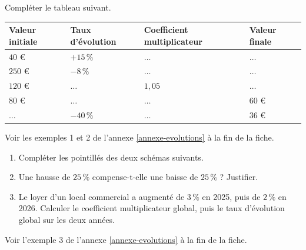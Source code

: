 \documentclass[10pt,a4paper]{article}
\begin{document}
\begin{bloc}
\begin{exo}
Compléter le tableau suivant.

\medskip

\begin{center}
\renewcommand{\arraystretch}{1.5}
\begin{tabular}{|C{0.18\textwidth}|C{0.18\textwidth}|C{0.18\textwidth}|C{0.18\textwidth}|}
    \hline
    \textbf{Valeur initiale} & \textbf{Taux d'évolution} & \textbf{Coefficient multiplicateur} & \textbf{Valeur finale} \\ \hline
    \(40\) \euro & \(+15\,\%\) & \(\dots\) & \(\dots\) \\ \hline
    \(250\) \euro & \(-8\,\%\) & \(\dots\) & \(\dots\) \\ \hline
    \(120\) \euro & \(\dots\) & \(1,05\) & \(\dots\) \\ \hline
    \(80\) \euro & \(\dots\) & \(\dots\) & \(60\) \euro \\ \hline
    \(\dots\) & \(-40\,\%\) & \(\dots\) & \(36\) \euro \\ \hline
\end{tabular}
\end{center}
\end{exo}

\begin{indication}
    Voir les exemples 1 et 2 de l'annexe \ref{annexe-evolutions} à la fin de la fiche.
\end{indication}
\end{bloc}

\begin{bloc}
\begin{exo}
\begin{enumerate}[leftmargin=*]
    \item Compléter les pointillés des deux schémas suivants.


    \item Une hausse de \(25\,\%\) compense-t-elle une baisse de \(25\,\%\) ? Justifier.
    \item Le loyer d'un local commercial a augmenté de \(3\,\%\) en 2025, puis de \(2\,\%\) en 2026. Calculer le coefficient multiplicateur global, puis le taux d'évolution global sur les deux années.
\end{enumerate}
\end{exo}

\begin{indication}
    Voir l'exemple 3 de l'annexe \ref{annexe-evolutions} à la fin de la fiche.
\end{indication}
\end{bloc}
\end{document}
